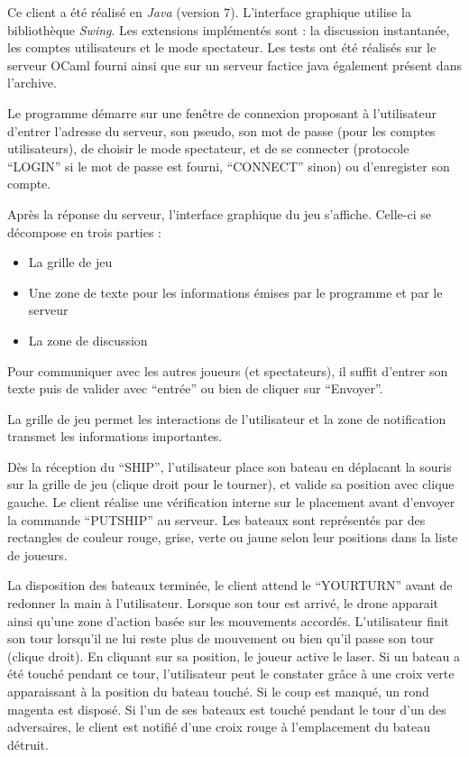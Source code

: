 \documentclass[a4paper, 11pt]{report}
\begin{document}
Ce client a été réalisé en \emph{Java} (version 7). L'interface graphique utilise 
la bibliothèque \emph{Swing}. Les extensions implémentés sont : la discussion instantanée,
les comptes utilisateurs et le mode spectateur. Les tests ont été réalisés sur le serveur OCaml
fourni ainsi que sur un serveur factice java également présent dans l'archive.

Le programme démarre sur une fenêtre de connexion proposant à l'utilisateur d'entrer
l'adresse du serveur, son pseudo, son mot de passe (pour les comptes utilisateurs), de choisir
le mode spectateur, et de se connecter (protocole ``LOGIN'' si le mot de passe est fourni, ``CONNECT'' sinon) ou d'enregister son compte.

Après la réponse du serveur, l'interface graphique du jeu s'affiche. Celle-ci se décompose en
trois parties :
\begin{itemize}
  \item La grille de jeu
  \item Une zone de texte pour les informations émises par le programme et par le serveur
  \item La zone de discussion
\end{itemize}\medskip{}

Pour communiquer avec les autres joueurs (et spectateurs), il suffit d'entrer son texte 
puis de valider avec ``entrée'' ou bien de cliquer sur ``Envoyer''.

La grille de jeu permet les interactions de l'utilisateur et la zone de notification transmet les
informations importantes.

Dès la réception du ``SHIP'', l'utilisateur place son bateau en déplacant la souris sur la grille
de jeu (clique droit pour le tourner), et valide sa position avec clique gauche. Le client
réalise une vérification interne sur le placement avant d'envoyer la commande ``PUTSHIP'' au serveur.
Les bateaux sont représentés par des rectangles de couleur rouge, grise, verte ou jaune selon
leur positions dans la liste de joueurs.

La disposition des bateaux terminée, le client attend le ``YOURTURN'' avant de redonner la main 
à l'utilisateur. Lorsque son tour est arrivé, le drone apparait ainsi qu'une zone d'action basée
sur les mouvements accordés. L'utilisateur finit son tour lorsqu'il ne lui reste plus de mouvement
ou bien qu'il passe son tour (clique droit). En cliquant sur sa position, le joueur active le laser.
Si un bateau a été touché pendant ce tour, l'utilisateur peut le constater grâce à une
croix verte apparaissant à la position du bateau touché. Si le coup est manqué, un rond magenta
est disposé. Si l'un de ses bateaux est touché pendant le tour d'un des adversaires, le client est
notifié d'une croix rouge à l'emplacement du bateau détruit.
\end{document}
